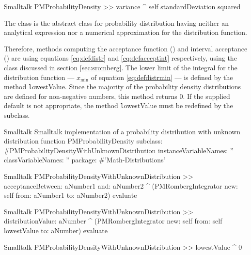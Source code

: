 \begin{displaycode}{Smalltalk}
PMProbabilityDensity >> variance
    ^ self standardDeviation squared
\end{displaycode}

The class  is the abstract class for probability distribution having neither an analytical expression nor a numerical approximation for the distribution function.

Therefore, methods computing the acceptance function () and interval acceptance () are using equations \ref{eq:defdistr} and \ref{eq:defacceptint} respectively, using the class  discussed in section \ref{sec:sromberg}.
The lower limit of the integral for the distribution function ---
$x_{\min}$ of equation \ref{eq:defdistrmin} --- is defined by the
method {\texttt lowestValue}. Since the majority of the probability
density distributions are defined for non-negative numbers, this method returns 0. If the supplied default is not appropriate, the method {\texttt lowestValue} must be redefined by the subclass.

%

\begin{listing}[label=lst:probunkdistr]{Smalltalk}
{Smalltalk implementation of a probability distribution with unknown distribution function}
PMProbabilityDensity subclass: #PMProbabilityDensityWithUnknownDistribution
   instanceVariableNames: ''
    classVariableNames: ''
    package: #'Math-Distributions'
\end{listing}

\begin{displaycode}{Smalltalk}
PMProbabilityDensityWithUnknownDistribution >> acceptanceBetween: aNumber1 and: aNumber2
    ^ (PMRombergIntegrator new: self from: aNumber1 to: aNumber2) 
                                                              evaluate
\end{displaycode}

\begin{displaycode}{Smalltalk}
PMProbabilityDensityWithUnknownDistribution >> distributionValue: aNumber
    ^ (PMRombergIntegrator new: self from: self lowestValue to: 
                                                     aNumber) evaluate
\end{displaycode}

\begin{displaycode}{Smalltalk}
PMProbabilityDensityWithUnknownDistribution >> lowestValue
    ^ 0
\end{displaycode}

